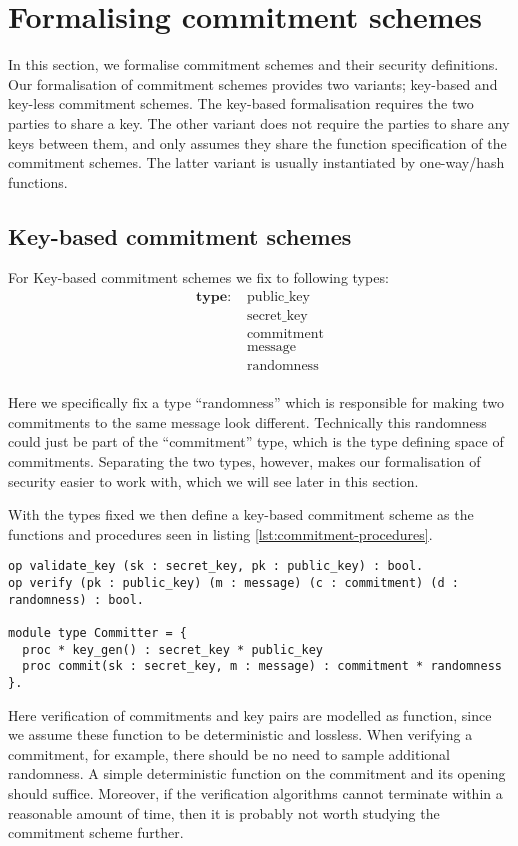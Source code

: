 \chapter{Formalising commitment schemes}
\label{ch:formal_commitment}
In this section, we formalise commitment schemes and their security definitions.
Our formalisation of commitment schemes provides two variants; key-based and
key-less commitment schemes.
The key-based formalisation requires the two parties to share a key.
The other variant does not require the parties to share any keys between them, and
only assumes they share the function specification of the commitment schemes.
The latter variant is usually instantiated by one-way/hash functions.

\section{Key-based commitment schemes}
\label{sec:commitment:key-based}
For Key-based commitment schemes we fix to following types:
\begin{align*}
  \textbf{type: } &\text{public\_key} \\
  &\text{secret\_key} \\
  &\text{commitment} \\
  &\text{message} \\
  &\text{randomness} \\
\end{align*}

Here we specifically fix a type ``randomness'' which is responsible for making two
commitments to the same message look different. Technically this randomness
could just be part of the ``commitment'' type, which is the type defining space
of commitments.
Separating the two types, however, makes
our formalisation of security easier to work with, which we will see later in
this section.

With the types fixed we then define a key-based commitment scheme as the
functions and procedures seen in listing \ref{lst:commitment-procedures}.

\begin{lstlisting}[float,label=lst:commitment-procedures,caption= Key-Based commitment specification]
op validate_key (sk : secret_key, pk : public_key) : bool.
op verify (pk : public_key) (m : message) (c : commitment) (d : randomness) : bool.

module type Committer = {
  proc * key_gen() : secret_key * public_key
  proc commit(sk : secret_key, m : message) : commitment * randomness
}.
\end{lstlisting}
Here verification of commitments and key pairs are modelled as function, since
we assume these function to be deterministic and lossless.
When verifying a commitment, for example, there should be no need to sample
additional randomness. A simple deterministic function on the commitment and its
opening should suffice. Moreover, if the
verification algorithms cannot terminate within a reasonable amount of time,
then it is probably not worth studying the commitment scheme further.

